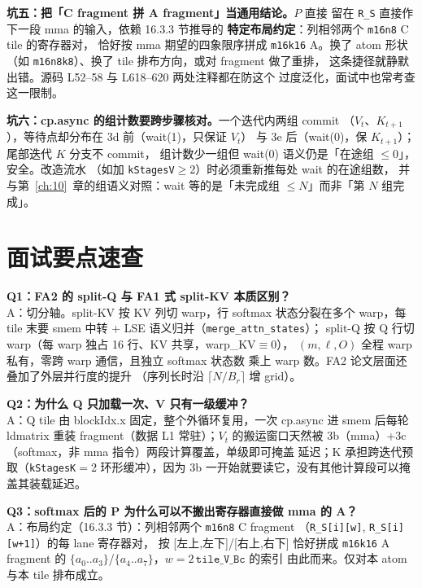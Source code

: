\textbf{坑五：把「C fragment 拼 A fragment」当通用结论。}$P$ 直接
留在 \texttt{R\_S} 直接作下一段 mma 的输入，依赖 16.3.3 节推导的
\textbf{特定布局约定}：列相邻两个 \texttt{m16n8} C tile 的寄存器对，
恰好按 mma 期望的四象限序拼成 \texttt{m16k16} A。换了 atom 形状
（如 \texttt{m16n8k8}）、换了 tile 排布方向，或对 fragment 做了重排，
这条捷径就静默出错。源码 L52--58 与 L618--620 两处注释都在防这个
过度泛化，面试中也常考查这一限制。

\textbf{坑六：cp.async 的组计数要跨步骤核对。}一个迭代内两组 commit
（$V_t$、$K_{t+1}$），等待点却分布在 3d 前（wait(1)，只保证 $V_t$）
与 3e 后（wait(0)，保 $K_{t+1}$）；尾部迭代 $K$ 分支不 commit，
组计数少一组但 wait(0) 语义仍是「在途组 $\le 0$」，安全。改造流水
（如加 \texttt{kStagesV}$\ge$2）时必须重新推每处 wait 的在途组数，
并与第~\ref{ch:10}~章的组语义对照：wait 等的是「未完成组
$\le N$」而非「第 $N$ 组完成」。

\section{面试要点速查}

\textbf{Q1：FA2 的 split-Q 与 FA1 式 split-KV 本质区别？}\\
A：切分轴。split-KV 按 KV 列切 warp，行 softmax 状态分裂在多个
warp，每 tile 末要 smem 中转 + LSE 语义归并（\texttt{merge\_\allowbreak{}attn\_\allowbreak{}states}）；
split-Q 按 Q 行切 warp（每 warp 独占 16 行、KV 共享，warp\_KV$\equiv$0），
$(m,\ell,O)$ 全程 warp 私有，零跨 warp 通信，且独立 softmax 状态数
乘上 warp 数。FA2 论文层面还叠加了外层并行度的提升
（序列长时沿 $\lceil N/B_r\rceil$ 增 grid）。

\textbf{Q2：为什么 Q 只加载一次、V 只有一级缓冲？}\\
A：Q tile 由 blockIdx.x 固定，整个外循环复用，一次 cp.async 进 smem
后每轮 ldmatrix 重装 fragment（数据 L1 常驻）；$V_t$ 的搬运窗口天然被
3b（mma）+3c（softmax，非 mma 指令）两段计算覆盖，单级即可掩盖
延迟；K 承担跨迭代预取（\texttt{kStagesK}$=$2 环形缓冲），因为 3b
一开始就要读它，没有其他计算段可以掩盖其装载延迟。

\textbf{Q3：softmax 后的 P 为什么可以不搬出寄存器直接做 mma 的 A？}\\
A：布局约定（16.3.3 节）：列相邻两个 \texttt{m16n8} C fragment
（\texttt{R\_S[i][w]}, \texttt{R\_S[i][w+1]}）的每 lane 寄存器对，
按 [左上,左下]/[右上,右下] 恰好拼成 \texttt{m16k16} A fragment 的
$\{a_0..a_3\}$/$\{a_4..a_7\}$，$w=2\,\texttt{tile\_V\_Bc}$ 的索引
由此而来。仅对本 atom 与本 tile 排布成立。

